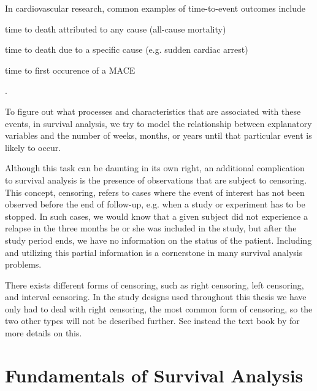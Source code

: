 In cardiovascular research, 
common examples of time-to-event outcomes include
\begin{enumerate*}
    \item time to death attributed to any cause (all-cause mortality)
    \item time to death due to a specific cause (e.g. sudden cardiac arrest)
    \item time to first occurence of a \ac{MACE}
\end{enumerate*}.

To figure out what processes and characteristics 
that are associated with these events, 
in survival analysis, we try to model the relationship between
explanatory variables and the number of weeks, months, or years 
until that particular event is likely to occur. 


Although this task can be daunting in its own right, 
an additional complication to survival analysis 
is the presence of observations that are subject to 
censoring.
This concept, censoring, refers to cases 
where the event of interest has not been observed 
before the end of follow-up, 
e.g. when a study or experiment has to be stopped.
In such cases, 
we would know that a given subject did not experience a relapse 
in the three months he or she was included in the study, 
but after the study period ends, 
we have no information on the status of the patient. 
Including and utilizing this partial information
is a cornerstone in many survival analysis problems.

There exists different forms of censoring,
such as right censoring, left censoring, and interval censoring.
In the study designs used throughout this thesis 
we have only had to deal with right censoring,
the most common form of censoring,
so the two other types will not be described further.
See instead the text book by \citeauthor{kleinSurvival2003} 
for more details on this.
~\autocite{kleinSurvival2003}

\section{Fundamentals of Survival Analysis}

